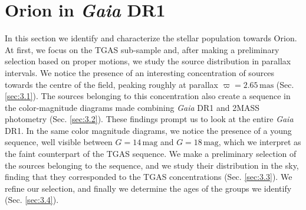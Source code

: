 \documentclass[twocolumn]{aa}
\begin{document}
 	
\section{Orion in \textit{Gaia} DR1}\label{Sec:3}
In this section we identify and characterize the stellar population towards Orion. At first, we focus on the TGAS sub-sample and, after making a preliminary selection based on proper motions, we study the source distribution in parallax intervals. We notice the presence of an interesting concentration of sources towards the centre of the field, peaking roughly at parallax $\varpi = 2.65 \, \mathrm{mas}$ (Sec. \ref{sec:3.1}). The sources belonging to this concentration also create a sequence in the color-magnitude diagrams made combining \textit{Gaia} DR1 and 2MASS photometry (Sec. \ref{sec:3.2}). These findings prompt us to look at the entire \textit{Gaia} DR1. In the same color magnitude diagrams, we notice the presence of a young sequence, well visible between $G = 14 \, \mathrm{mag}$ and $G = 18 \, \mathrm{mag}$, which we interpret as the faint counterpart of the TGAS sequence. We make a preliminary selection of the sources belonging to the sequence, and we study their distribution in the sky, finding that they corresponded to the TGAS concentrations (Sec. \ref{sec:3.3}). We refine our selection, and finally we determine the ages of the groups we identify (Sec. \ref{sec:3.4}).
\end{document}
